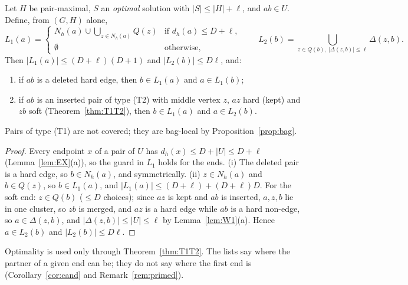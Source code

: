 \begin{proposition}\label{prop:candlist}
Let $H$ be pair-maximal, $S$ an \emph{optimal} solution with $|S|\le|H|+\ell$, and $ab\in U$. Define, from $(G,H)$ alone,
\[
L_1(a)=\begin{cases}N_h(a)\cup\bigcup_{z\in N_h(a)}Q(z)&\text{if }d_h(a)\le D+\ell,\\ \emptyset&\text{otherwise,}\end{cases}\qquad
L_2(b)=\bigcup_{z\in Q(b),\ |\Delta(z,b)|\le\ell}\Delta(z,b).
\]
Then $|L_1(a)|\le(D+\ell)(D+1)$ and $|L_2(b)|\le D\ell$, and:
\begin{enumerate}
\item[(i)] if $ab$ is a deleted hard edge, then $b\in L_1(a)$ and $a\in L_1(b)$;
\item[(ii)] if $ab$ is an inserted pair of type (T2) with middle vertex $z$, $az$ hard (kept) and $zb$ soft (Theorem~\ref{thm:T1T2}), then $b\in L_1(a)$ and $a\in L_2(b)$.
\end{enumerate}
Pairs of type (T1) are not covered; they are bag-local by Proposition~\ref{prop:bag}.
\end{proposition}
\begin{proof}
Every endpoint $x$ of a pair of $U$ has $d_h(x)\le D+|U|\le D+\ell$ (Lemma~\ref{lem:EX}(a)), so the guard in $L_1$ holds for the ends. (i) The deleted pair is a hard edge, so $b\in N_h(a)$, and symmetrically. (ii) $z\in N_h(a)$ and $b\in Q(z)$, so $b\in L_1(a)$, and $|L_1(a)|\le(D+\ell)+(D+\ell)D$. For the soft end: $z\in Q(b)$ ($\le D$ choices); since $az$ is kept and $ab$ is inserted, $a,z,b$ lie in one cluster, so $zb$ is merged, and $az$ is a hard edge while $ab$ is a hard non-edge, so $a\in\Delta(z,b)$, and $|\Delta(z,b)|\le|U|\le\ell$ by Lemma~\ref{lem:W1}(a). Hence $a\in L_2(b)$ and $|L_2(b)|\le D\ell$.
\end{proof}
Optimality is used only through Theorem~\ref{thm:T1T2}. The lists say where the partner of a given end can be; they do not say where the first end is (Corollary~\ref{cor:cand} and Remark~\ref{rem:primed}).

